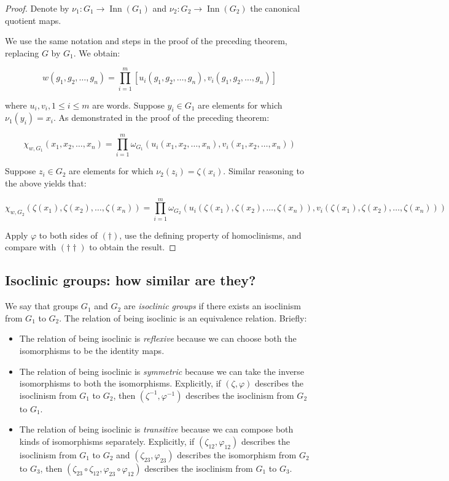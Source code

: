 \documentclass{ucetd}
\begin{document}
\begin{proof}
  Denote by $\nu_1:G_1 \to \operatorname{Inn}(G_1)$ and $\nu_2:G_2 \to
  \operatorname{Inn}(G_2)$ the canonical quotient maps.

  We use the same notation and steps in the proof of the preceding
  theorem, replacing $G$ by $G_1$. We obtain:

  $$w(g_1,g_2,\dots,g_n) =  \prod_{i=1}^m[u_i(g_1,g_2,\dots,g_n),v_i(g_1,g_2,\dots,g_n)]$$

  where $u_i,v_i, 1 \le i \le m$ are words. Suppose $y_i \in G_1$ are
  elements for which $\nu_1(y_i) = x_i$. As demonstrated in the proof of
  the preceding theorem:

  \begin{equation*}
    \chi_{w,G_1}(x_1,x_2,\dots,x_n) = \prod_{i=1}^m \omega_{G_1}(u_i(x_1,x_2,\dots,x_n),v_i(x_1,x_2,\dots,x_n)) \tag{$\dagger$}
  \end{equation*}

  Suppose $z_i \in G_2$ are elements for which $\nu_2(z_i) =
  \zeta(x_i)$. Similar reasoning to the above yields that:

  \begin{equation*}
    \chi_{w,G_2}(\zeta(x_1),\zeta(x_2),\dots,\zeta(x_n)) = \prod_{i=1}^m \omega_{G_2}(u_i(\zeta(x_1),\zeta(x_2),\dots,\zeta(x_n)),v_i(\zeta(x_1),\zeta(x_2),\dots,\zeta(x_n))) \tag{$\dagger\dagger$}
  \end{equation*}

  Apply $\varphi$ to both sides of $(\dagger)$, use the defining
  property of homoclinisms, and compare with $(\dagger\dagger)$ to
  obtain the result.
\end{proof}

\subsection{Isoclinic groups: how similar are they?}

We say that groups $G_1$ and $G_2$ are {\em isoclinic groups} if there
exists an isoclinism from $G_1$ to $G_2$. The relation of being
isoclinic is an equivalence relation. Briefly:

\begin{itemize}
\item The relation of being isoclinic is {\em reflexive} because we
  can choose both the isomorphisms to be the identity maps.
\item The relation of being isoclinic is {\em symmetric} because we
  can take the inverse isomorphisms to both the
  isomorphisms. Explicitly, if $(\zeta,\varphi)$ describes the
  isoclinism from $G_1$ to $G_2$, then $(\zeta^{-1},\varphi^{-1})$
  describes the isoclinism from $G_2$ to $G_1$.
\item The relation of being isoclinic is {\em transitive} because we
  can compose both kinds of isomorphisms separately. Explicitly, if
  $(\zeta_{12},\varphi_{12})$ describes the isoclinism from $G_1$ to
  $G_2$ and $(\zeta_{23},\varphi_{23})$ describes the isomorphism from
  $G_2$ to $G_3$, then $(\zeta_{23} \circ \zeta_{12}, \varphi_{23}
  \circ \varphi_{12})$ describes the isoclinism from $G_1$ to $G_3$.
\end{itemize}
\end{document}
